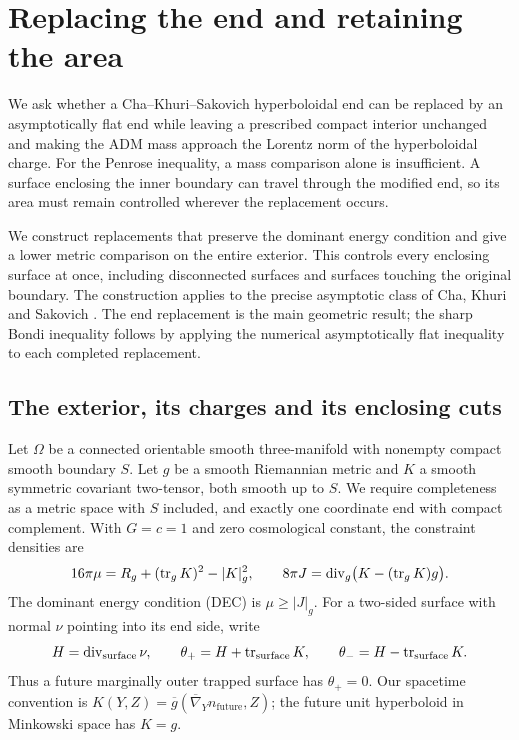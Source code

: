 \section{Replacing the end and retaining the area}\label{sec:introduction}

We ask whether a Cha--Khuri--Sakovich hyperboloidal end can be replaced
by an asymptotically flat end while leaving a prescribed compact
interior unchanged and making the ADM mass approach the Lorentz norm
of the hyperboloidal charge.
For the Penrose inequality, a mass comparison alone is insufficient.
A surface enclosing the inner boundary can travel through the modified
end, so its area must remain controlled wherever the replacement occurs.

We construct replacements that preserve the dominant energy condition
and give a lower metric comparison on the entire exterior. This controls
every enclosing surface at once, including disconnected surfaces and
surfaces touching the original boundary. The construction applies to
the precise asymptotic class of Cha, Khuri and Sakovich
\cite{CKS}. The end replacement is the main geometric result; the sharp
Bondi inequality follows by applying the numerical asymptotically flat
inequality to each completed replacement.

\subsection{The exterior, its charges and its enclosing cuts}
Let $\Omega$ be a connected orientable smooth three-manifold with
nonempty compact smooth boundary $S$. Let $g$ be a smooth Riemannian
metric and $K$ a smooth symmetric covariant two-tensor, both smooth up
to $S$. We require completeness as a metric space with $S$ included,
and exactly one coordinate end with compact complement.
With $G=c=1$ and zero cosmological constant, the constraint densities are
\begin{equation}\label{eq:constraints-definition}
 16\pi\mu=R_g+(\operatorname{tr}_gK)^2-|K|_g^2,
 \qquad 8\pi J=\operatorname{div}_g\bigl(K-(\operatorname{tr}_gK)g\bigr).
\end{equation}
The dominant energy condition (DEC) is $\mu\geq |J|_g$.
For a two-sided surface with normal $\nu$ pointing into its end side,
write
\[
 H=\operatorname{div}_{\mathrm{surface}}\nu,\qquad
 \theta_+=H+\operatorname{tr}_{\mathrm{surface}}K,\qquad
 \theta_-=H-\operatorname{tr}_{\mathrm{surface}}K.
\]
Thus a future marginally outer trapped surface has $\theta_+=0$.
Our spacetime convention is
$K(Y,Z)=\overline g(\overline\nabla_Yn_{\mathrm{future}},Z)$;
the future unit hyperboloid in Minkowski space has $K=g$.

